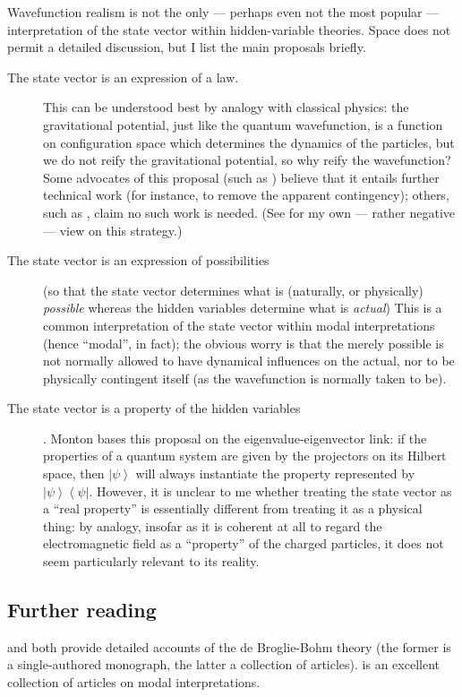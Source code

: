 \documentclass[12pt]{article}
\newcommand{\ket}[1]{\ensuremath{\left|  #1 \right\rangle}}
\newcommand{\bra}[1]{\ensuremath{\left\langle #1 \right|}}
\newcommand{\proj}[2]{\ensuremath{\ket{#1} \bra{#2}}}
\begin{document}
Wavefunction realism is not the only --- perhaps even not the most popular --- interpretation of the state vector within hidden-variable theories. Space does not permit a detailed discussion, but I list the main proposals briefly.
\begin{description}
\item[The state vector is an expression of a law.] This  can be understood best by analogy with classical physics: the gravitational potential, just like the quantum wavefunction, is a function on configuration space which determines the dynamics of the particles, but we do not reify the gravitational potential, so why reify the wavefunction? Some advocates of this proposal (such as ) believe that it entails further technical work (for instance, to remove the apparent contingency); others, such as , claim no such work is needed. (See  for my own --- rather negative --- view on this strategy.)
\item[The state vector is an expression of possibilities] (so that the state vector determines what is (naturally, or physically) \emph{possible} whereas the hidden variables determine what is \emph{actual}) This is a common interpretation of the state vector within modal interpretations (hence ``modal'', in fact); the obvious worry is that the merely possible is not normally allowed to have dynamical influences on the actual, nor to be physically contingent itself (as the wavefunction is normally taken to be). 
\item[The state vector is a property of the hidden variables] \cite{montonconfiguration}. Monton bases this proposal on the eigenvalue-eigenvector link: if the properties of a quantum system are given by the projectors on its Hilbert space, then \ket{\psi} will always instantiate the property represented by \proj{\psi}{\psi}. However, it is unclear to me whether treating the state vector as a ``real property'' is essentially different from treating it as a physical thing: by analogy, insofar as it is coherent at all to regard the electromagnetic field as a ``property'' of the charged particles, it does not seem particularly relevant to its reality.
\end{description}

\subsection{Further reading}

  and  both provide detailed accounts of the de Broglie-Bohm theory (the former is a single-authored monograph, the latter a collection of articles).  is an excellent collection of articles on modal interpretations. 
\end{document}
